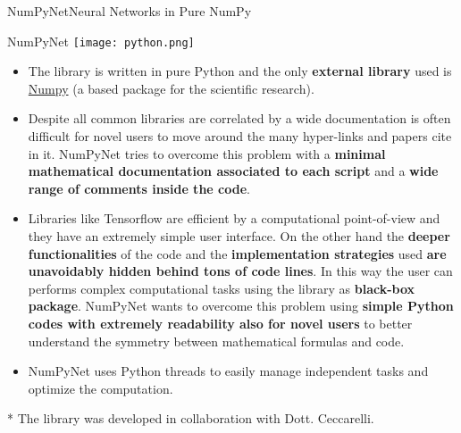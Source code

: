 \documentclass{standalone}
\begin{document}
\begin{frame}{NumPyNet}{Neural Networks in Pure NumPy}


  \begin{block}{NumPyNet \hfill\texttt{[image: python.png]}}
    \begin{itemize}
      \item The library is written in pure \textsf{Python} and the only \textbf{external library} used is \href{http://www.numpy.org}{\textsf{Numpy}} (a based package for the scientific research).

      \item Despite all common libraries are correlated by a wide documentation is often difficult for novel users to move around the many hyper-links and papers cite in it.
      \textsf{NumPyNet} tries to overcome this problem with a \textbf{minimal mathematical documentation associated to each script} and a \textbf{wide range of comments inside the code}.

      \item Libraries like \textsf{Tensorflow} are efficient by a computational point-of-view and they have an extremely simple user interface.
      On the other hand the \textbf{deeper functionalities} of the code and the \textbf{implementation strategies} used \textbf{are unavoidably hidden behind tons of code lines}.
      In this way the user can performs complex computational tasks using the library as \textbf{black-box package}.
      \textsf{NumPyNet} wants to overcome this problem using \textbf{simple \textsf{Python} codes with extremely readability also for novel users} to better understand the symmetry between mathematical formulas and code.

      \item \textsf{NumPyNet} uses \textsf{Python} threads to easily manage independent tasks and optimize the computation.

    \end{itemize}
  \end{block}

  \vfill\scriptsize{* The library was developed in collaboration with Dott. Ceccarelli.}

\end{frame}
\end{document}
